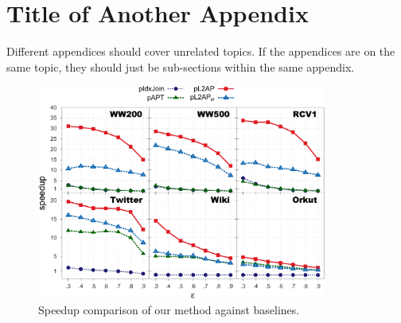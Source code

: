 \section{Title of Another Appendix}\label{apx:appendix2}

Different appendices should cover unrelated topics. If the appendices are on the same topic, they should just be sub-sections within the same appendix. 

\begin{figure}[tbh]
  \centering
  \includegraphics[width=0.85\textwidth]{figures/speedup2-nbase.pdf}
  \caption{Speedup comparison of our method against baselines.}
  \label{fig:speedup}
\end{figure}
